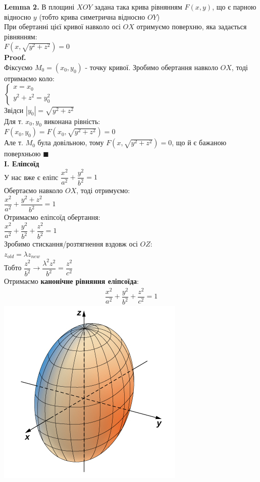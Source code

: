\documentclass[a4paper, 14pt]{extarticle}
\def\lm#1{\textbf{Lemma {#1}}}
\def\proof{\textbf{Proof.}\\}
\def\bigline{\vspace{5mm}\\}
\def\qed{$\blacksquare$}
\begin{document}
\lm{2.} В площині $XOY$ задана така крива рівнянням $F(x,y)$, що є парною відносно $y$ (тобто крива симетрична відносно $OY$)\\
При обертанні цієї кривої навколо осі $OX$ отримуємо поверхню, яка задається рівнянням:\\
$F(x,\sqrt{y^2+z^2})=0$\\
\proof
Фіксуємо $M_0 = (x_0,y_0)$ - точку кривої. Зробимо обертання навколо $OX$, тоді отримаємо коло:\\
$\begin{cases}
x = x_0 \\
y^2 + z^2 = y_0^2
\end{cases}
$\\
Звідси $|y_0| = \sqrt{y^2+z^2}$\\
Для т. $x_0,y_0$ виконана рівність:\\
$F(x_0,y_0) = F(x_0, \sqrt{y^2+z^2}) = 0$\\
Але т. $M_0$ була довільною, тому $F(x,\sqrt{y^2+z^2})=0$, що й є бажаною поверхньою \qed
\bigline
\textbf{I. Еліпсоїд}\\
У нас вже є еліпс $\dfrac{x^2}{a^2} + \dfrac{y^2}{b^2} = 1$\\
Обертаємо навколо $OX$, тоді отримуємо:\\
$\dfrac{x^2}{a^2} + \dfrac{y^2+z^2}{b^2} = 1$\\
Отримаємо еліпсоїд обертання:\\
$\dfrac{x^2}{a^2} + \dfrac{y^2}{b^2} + \dfrac{z^2}{b^2} = 1$\\
Зробимо стискання/розтягнення вздовж осі $OZ$:\\
$z_{old} = \lambda z_{new}$\\
Тобто $\dfrac{z^2}{b^2} \to \dfrac{\lambda^2 z^2}{b^2} = \dfrac{z^2}{c^2}$\\
Отримаємо \textbf{канонічне рівняння еліпсоїда}:
\begin{align*}
\dfrac{x^2}{a^2} + \dfrac{y^2}{b^2} + \dfrac{z^2}{c^2} = 1
\end{align*}
\includegraphics[scale=1]{ellipsoid.jpeg}
\end{document}

